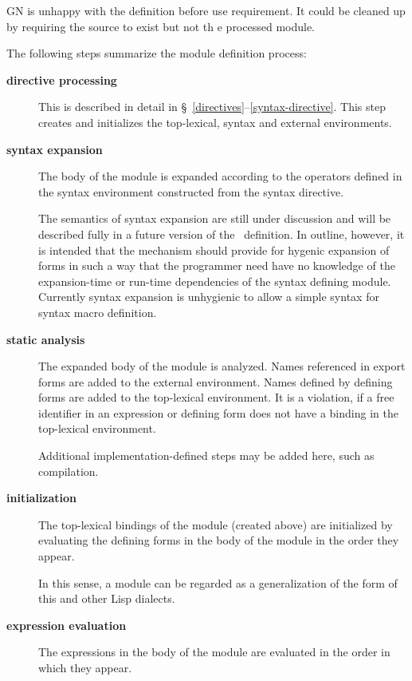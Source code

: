 %
\begin{optPrivate}
    GN is unhappy with the definition before use requirement.  It could be
    cleaned up by requiring the source to exist but not th e processed module.
\end{optPrivate}
%
\begin{optDefinition}
The following steps summarize the module definition process:
%
\begin{description}
    \item[{\bf directive processing}] This is described in detail in
    \S~\ref{directives}--\ref{syntax-directive}.  This step creates and
    initializes the top-lexical, syntax and external environments.

    \item[{\bf syntax expansion}] 
     
     The body of the module is expanded
    according to the operators defined in the syntax environment constructed
    from the syntax directive.
    \begin{note}
        The semantics of syntax expansion are still under discussion and will be
        described fully in a future version of the \eulisp\ definition.  In
        outline, however, it is intended that the mechanism should provide for
        hygenic expansion of forms in such a way that the programmer need have
        no knowledge of the expansion-time or run-time dependencies of the
        syntax defining module.  Currently syntax expansion is unhygienic to
        allow a simple syntax for syntax macro definition.
    \end{note}

    \item[{\bf static analysis}] The expanded body of the module is analyzed.
    Names referenced in export forms are added to the external environment.
    Names defined by defining forms are added to the top-lexical environment. It
    is a violation, if a free identifier in an expression or defining form
    does not have a binding in the top-lexical environment.
    \begin{note}
        Additional implementation-defined steps may be added here, such as
        compilation.
    \end{note}

    \item[{\bf initialization}] The top-lexical bindings of the module (created
    above) are initialized by evaluating the defining forms in the body of the
    module in the order they appear.
    \begin{note}
        In this sense, a module can be regarded as a generalization of the
         form of this and other Lisp dialects.
    \end{note}

    \item[{\bf expression evaluation}] The expressions in the body of the module
    are evaluated in the order in which they appear.
\end{description}
%
\end{optDefinition}
